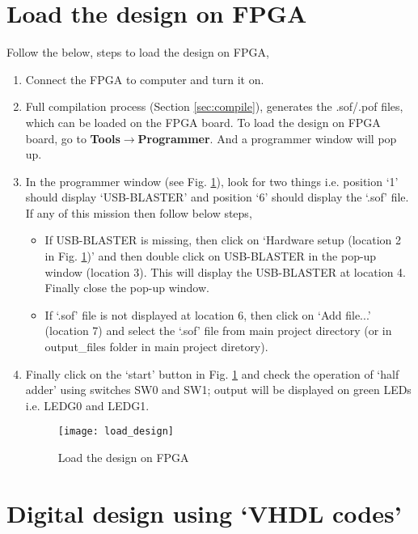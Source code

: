 \section{Load the design on FPGA} \label{sec:load_fpga_design}

Follow the below, steps to load the design on FPGA, 

\begin{enumerate}
	\item Connect the FPGA to computer and turn it on. 
	
	\item Full compilation process (Section \ref{sec:compile}), generates the .sof/.pof files, which can be loaded on the FPGA board. To load the design on FPGA board, go to \textbf{Tools$\rightarrow$Programmer}. And a programmer window will pop up. 
	
	\item In the programmer window (see Fig. \ref{fig:load_design}), look for two things i.e. position `1' should display `USB-BLASTER' and position `6' should display the `.sof' file. If any of this mission then follow below steps, 
	
	\begin{itemize}
		\item If USB-BLASTER is missing, then click on `Hardware setup (location 2 in Fig. \ref{fig:load_design})' and then double click on USB-BLASTER in the pop-up window (location 3). This will display the USB-BLASTER at location 4. Finally close the pop-up window. 
		
		\item If `.sof' file is not displayed at location 6, then click on `Add file...' (location 7) and select the `.sof' file from main project directory (or in output\_files folder in main project diretory).
	\end{itemize} 
	
	\item Finally click on the `start' button in Fig. \ref{fig:load_design} and check the operation of `half adder' using switches SW0 and SW1; output will be displayed on green LEDs i.e. LEDG0 and LEDG1. 
	
	\begin{figure}[!h]
		\centering
		\texttt{[image: load\_design]}
		\caption{Load the design on FPGA}
		\label{fig:load_design}
	\end{figure}
\end{enumerate}

\section{Digital design using `VHDL codes'} \label{sec:digital_des_with_vhdl}

